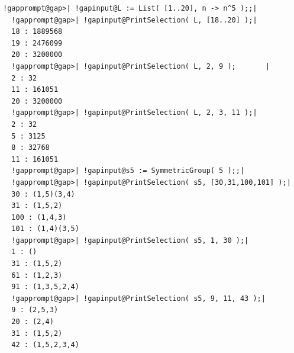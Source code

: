 \documentclass[a4paper,11pt]{report}
\begin{document}
{{{ 
\begin{Verbatim}[commandchars=!@|,fontsize=\small,frame=single,label=Example]
  !gapprompt@gap>| !gapinput@L := List( [1..20], n -> n^5 );;|
  !gapprompt@gap>| !gapinput@PrintSelection( L, [18..20] );|
  18 : 1889568
  19 : 2476099
  20 : 3200000
  !gapprompt@gap>| !gapinput@PrintSelection( L, 2, 9 );       |
  2 : 32
  11 : 161051
  20 : 3200000
  !gapprompt@gap>| !gapinput@PrintSelection( L, 2, 3, 11 );|
  2 : 32
  5 : 3125
  8 : 32768
  11 : 161051
  !gapprompt@gap>| !gapinput@s5 := SymmetricGroup( 5 );;|
  !gapprompt@gap>| !gapinput@PrintSelection( s5, [30,31,100,101] );|
  30 : (1,5)(3,4)
  31 : (1,5,2)
  100 : (1,4,3)
  101 : (1,4)(3,5)
  !gapprompt@gap>| !gapinput@PrintSelection( s5, 1, 30 );|
  1 : ()
  31 : (1,5,2)
  61 : (1,2,3)
  91 : (1,3,5,2,4)
  !gapprompt@gap>| !gapinput@PrintSelection( s5, 9, 11, 43 );|
  9 : (2,5,3)
  20 : (2,4)
  31 : (1,5,2)
  42 : (1,5,2,3,4)
\end{Verbatim}
 }

 }

 }

         
\end{document}
